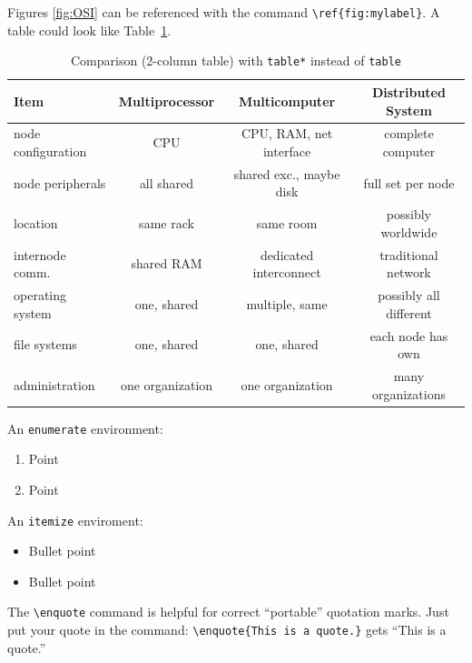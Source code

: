 Figures \ref{fig:OSI} can be referenced with the command \verb|\ref{fig:mylabel}|. A table could look like Table~\ref{tab:systemcomparison}.

\begin{table}[htbp]
    \centering
    \begin{tabular}{lccc} \toprule
        \textbf{Item}      & \textbf{Multiprocessor} & \textbf{Multicomputer}  & \textbf{Distributed System} \\\midrule
        node configuration & CPU                     & CPU, RAM, net interface & complete computer           \\\midrule
        node peripherals   & all shared              & shared exc., maybe disk & full set per node           \\\midrule
        location           & same rack               & same room               & possibly worldwide          \\\midrule
        internode comm.    & shared RAM              & dedicated interconnect  & traditional network         \\\midrule
        operating system   & one, shared             & multiple, same          & possibly all different      \\\midrule
        file systems       & one, shared             & one, shared             & each node has own           \\\midrule
        administration     & one organization        & one organization        & many organizations          \\\bottomrule
    \end{tabular}
    \caption{Comparison (2-column table) with \texttt{table*} instead of \texttt{table}}
    \label{tab:systemcomparison} %
\end{table}

\noindent An \texttt{enumerate} environment:
\begin{enumerate}
\item Point
\item Point
\end{enumerate} 

\noindent An \texttt{itemize} enviroment:
\begin{itemize}
\item Bullet point
\item Bullet point
\end{itemize}

The \verb|\enquote| command is helpful for correct \enquote{portable} quotation marks. Just put your quote in the command: \verb|\enquote{This is a quote.}| gets \enquote{This is a quote.}

